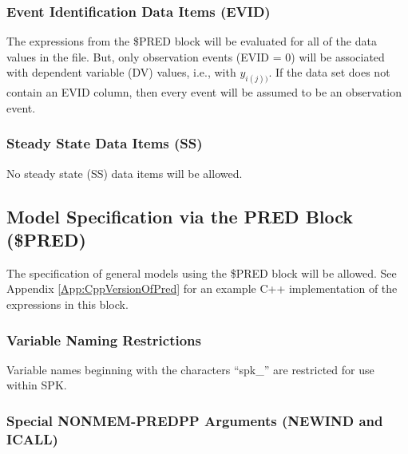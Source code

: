 \documentclass{article}
\begin{document}
\subsubsection{Event Identification Data Items (EVID)}

The expressions from the \$PRED block will be evaluated for all
of the data values in the file.
But, only observation events (EVID = 0) will be associated
with dependent variable (DV) values, i.e., with $y_{i(j))}$.
If the data set does not contain an EVID column, then every
event will be assumed to be an observation event.


\subsubsection{Steady State Data Items (SS)}

No steady state (SS) data items will be allowed.


\subsection{Model Specification via the PRED Block (\$PRED)}

The specification of general models using the \$PRED block will
be allowed.
See Appendix \ref{App:CppVersionOfPred} for an example C++ 
implementation of the expressions in this block.


\subsubsection{Variable Naming Restrictions}

Variable names beginning with the characters ``spk\_'' are restricted
for use within SPK.


\subsubsection{Special NONMEM-PREDPP Arguments (NEWIND and ICALL)}
\end{document}
